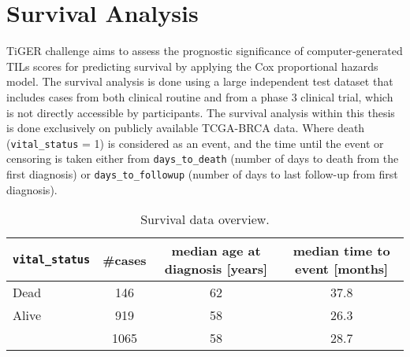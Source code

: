 \section{Survival Analysis}
TiGER challenge aims to assess the prognostic significance of computer-generated TILs scores
for predicting survival by applying the Cox proportional hazards model. The survival analysis
is done using a large independent test dataset that includes cases from both clinical routine and from a phase 3 clinical trial, which is not directly accessible by participants. The survival analysis
within this thesis is done exclusively on publicly available TCGA-BRCA data. Where death
(\texttt{vital\_status} = 1) is considered as an event, and the time until the event or censoring is
taken either from \texttt{days\_to\_death} (number of days to death from the first diagnosis) or \texttt{days\_to\_followup}
(number of days to last follow-up from first diagnosis). 
\begin{table}[h!]
\centering
\begin{tabular}{ l c c c } 
\hline
\texttt{vital\_status} & \#cases & median age at diagnosis [years] & median time to event [months]\\ 
\hline
Dead & 146 & 62 & 37.8\\ 
Alive & 919 & 58 & 26.3\\ 
\hline
 & 1065 & 58 & 28.7\\
\end{tabular}
\caption{\label{tab:surv_data}Survival data overview.}
\end{table}